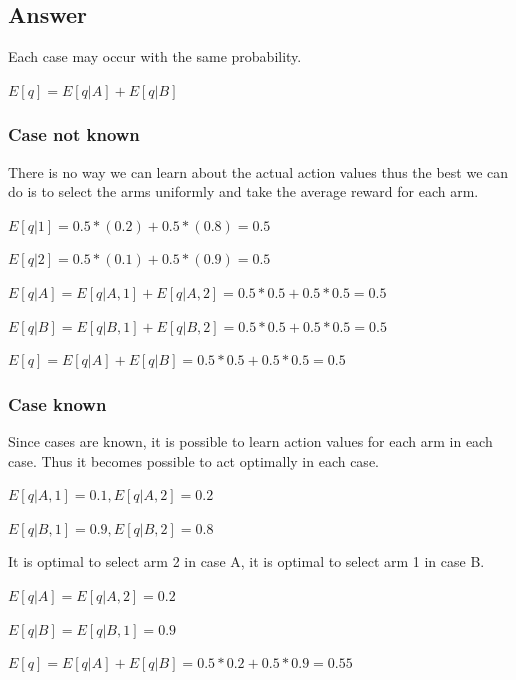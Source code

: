 \documentclass{article}
\begin{document}
    \subsection*{Answer}

    Each case may occur with the same probability.

    $E[q]=E[q|A]+E[q|B]$

    \subsubsection*{Case not known}

    There is no way we can learn about the actual action values thus the best we can do is to select the arms uniformly and take the average reward for each arm.

    $E[q|1]=0.5*(0.2)+0.5*(0.8) = 0.5$

    $E[q|2]=0.5*(0.1)+0.5*(0.9) = 0.5$

    $E[q|A] = E[q|A,1] + E[q|A,2] = 0.5 * 0.5 + 0.5 * 0.5 = 0.5 $

    $E[q|B] = E[q|B,1] + E[q|B,2] = 0.5 * 0.5 + 0.5 * 0.5 = 0.5 $

    $E[q]=E[q|A]+E[q|B] = 0.5 * 0.5 + 0.5 * 0.5 = 0.5$

    \subsubsection*{Case known}

    Since cases are known, it is possible to learn action values for each arm in each case.
    Thus it becomes possible to act optimally in each case.

    $E[q|A, 1] = 0.1, E[q|A, 2] = 0.2$

    $E[q|B, 1] = 0.9, E[q|B, 2] = 0.8$

    It is optimal to select arm 2 in case A, it is optimal to select arm 1 in case B.

    $E[q|A] = E[q|A,2] = 0.2 $

    $E[q|B] = E[q|B,1] = 0.9 $

    $E[q]=E[q|A]+E[q|B] = 0.5 * 0.2 + 0.5 * 0.9 = 0.55$
\end{document}
